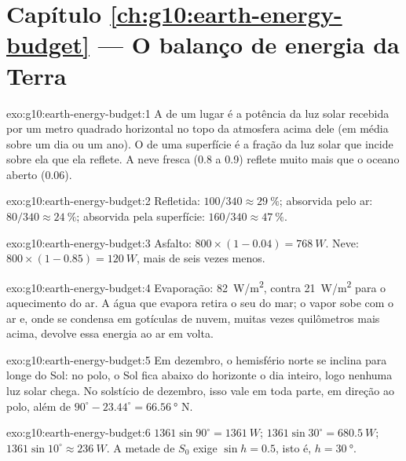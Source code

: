 \section*{Capítulo \ref{ch:g10:earth-energy-budget} --- O balanço de energia da Terra}

\begin{solution}{exo:g10:earth-energy-budget:1}
A  de um lugar é a potência da luz solar recebida por um metro
quadrado horizontal no topo da atmosfera acima dele (em média sobre um dia
ou um ano). O  de uma superfície é a fração da luz solar que incide
sobre ela que ela reflete. A neve fresca (0.8 a 0.9) reflete muito mais que
o oceano aberto (0.06).
\end{solution}

\begin{solution}{exo:g10:earth-energy-budget:2}
Refletida: $100/340 \approx \qty{29}{\percent}$; absorvida pelo ar:
$80/340 \approx \qty{24}{\percent}$; absorvida pela superfície: $160/340
\approx \qty{47}{\percent}$.
\end{solution}

\begin{solution}{exo:g10:earth-energy-budget:3}
Asfalto: $800 \times (1 - 0.04) = \qty{768}{W}$. Neve: $800 \times (1 -
0.85) = \qty{120}{W}$, mais de seis vezes menos.
\end{solution}

\begin{solution}{exo:g10:earth-energy-budget:4}
Evaporação: \qty{82}{W/m^2}, contra \qty{21}{W/m^2} para o aquecimento do
ar. A água que evapora retira o seu  do mar; o vapor sobe com
o ar e, onde se condensa em gotículas de nuvem, muitas vezes quilômetros
mais acima, devolve essa energia ao ar em volta.
\end{solution}

\begin{solution}{exo:g10:earth-energy-budget:5}
Em dezembro, o hemisfério norte se inclina para longe do Sol: no polo, o
Sol fica abaixo do horizonte o dia inteiro, logo nenhuma luz solar chega.
No solstício de dezembro, isso vale em toda parte, em direção ao polo, além de $90^\circ - 23.44^\circ =
\qty{66.56}{\degree}$ N.
\end{solution}

\begin{solution}{exo:g10:earth-energy-budget:6}
$1361 \sin 90^\circ = \qty{1361}{W}$; $1361 \sin 30^\circ =
\qty{680.5}{W}$; $1361 \sin 10^\circ \approx \qty{236}{W}$. A metade de
$S_0$ exige $\sin h = 0.5$, isto é, $h = \qty{30}{\degree}$.
\end{solution}

